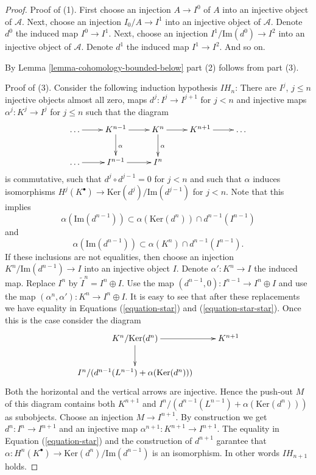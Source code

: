 \begin{proof}
Proof of (1). First choose an injection $A \to I^0$ of $A$ into an
injective object of $\mathcal{A}$. Next, choose an injection
$I_0/A \to I^1$ into an injective object of $\mathcal{A}$.
Denote $d^0$ the induced map $I^0 \to I^1$.
Next, choose an injection $I^1/\text{Im}(d^0) \to I^2$ into
an injective object of $\mathcal{A}$. Denote $d^1$ the induced
map $I^1 \to I^2$. And so on.

\medskip\noindent
By Lemma \ref{lemma-cohomology-bounded-below} part (2) follows from part (3).

\medskip\noindent
Proof of (3). Consider the following induction hypothesis
$IH_n$: There are $I^j$, $j \leq n$ injective objects almost
all zero, maps $d^j : I^j \to I^{j + 1}$ for $j < n$
and injective maps $\alpha^j : K^j \to I^j$ for $j \leq n$
such that the diagram
$$
\xymatrix{
\ldots \ar[r] & K^{n - 1} \ar[d]^\alpha \ar[r] &
K^n \ar[d]^\alpha \ar[r] &
K^{n + 1} \ar[r] & \ldots \\
\ldots \ar[r] & I^{n - 1} \ar[r] & I^n &  &
}
$$
is commutative, such that $d^j \circ d^{j - 1} = 0$ for $j < n$
and such that $\alpha$ induces isomorphisms
$H^j(K^\bullet) \to \text{Ker}(d^j)/\text{Im}(d^{j - 1})$
for $j < n$. Note that this implies
\begin{equation}
\label{equation-star}
\alpha(\text{Im}(d^{n - 1}))
\subset
\alpha(\text{Ker}(d^n)) \cap d^{n - 1}(I^{n - 1})
\end{equation}
and
\begin{equation}
\label{equation-star-star}
\alpha(\text{Im}(d^{n - 1}))
\subset
\alpha(K^n) \cap d^{n - 1}(I^{n - 1}).
\end{equation}
If these inclusions are not equalities, then choose an injection
$K^n/\text{Im}(d^{n - 1}) \to I$ into an injective object $I$.
Denote $\alpha' : K^n \to I$ the induced map.
Replace $I^n$ by $\tilde I^n = I^n \oplus I$. Use the
map $(d^{n - 1}, 0) : I^{n - 1} \to I^n \oplus I$ and use
the map $(\alpha^n , \alpha') : K^n \to I^n \oplus I$.
It is easy to see that after these replacements we have
equality in Equations (\ref{equation-star}) and (\ref{equation-star-star}).
Once this is the
case consider the diagram
$$
\xymatrix{
K^n/\text{Ker}(d^n) \ar[r] \ar[d] & K^{n + 1} \\
I^n/(d^{n - 1}(L^{n - 1}) + \alpha(\text{Ker}(d^n))) &
}
$$
Both the horizontal and the vertical arrows are injective.
Hence the push-out $M$ of this diagram contains both
$K^{n + 1}$ and $I^n/(d^{n - 1}(L^{n - 1}) + \alpha(\text{Ker}(d^n)))$
as subobjects. Choose an injection $M \to I^{n + 1}$.
By construction we get $d^n : I^n \to I^{n + 1}$
and an injective map $\alpha^{n + 1} : K^{n + 1} \to I^{n + 1}$.
The equality in Equation (\ref{equation-star}) and the construction of
$d^{n + 1}$ garantee that $\alpha : H^n(K^\bullet) \to
\text{Ker}(d^n)/\text{Im}(d^{n - 1})$ is an isomorphism.
In other words $IH_{n + 1}$ holds.


\end{proof}
